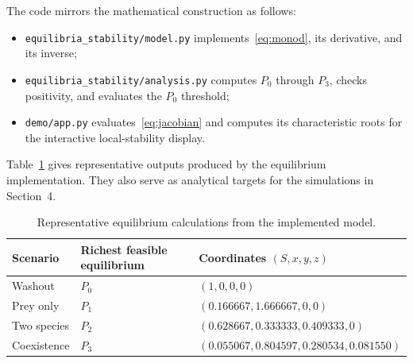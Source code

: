 The code mirrors the mathematical construction as follows:
\begin{itemize}
\item \texttt{equilibria\_stability/model.py} implements~\eqref{eq:monod},
      its derivative, and its inverse;
\item \texttt{equilibria\_stability/analysis.py} computes \(P_0\) through
      \(P_3\), checks positivity, and evaluates the \(P_0\) threshold;
\item \texttt{demo/app.py} evaluates~\eqref{eq:jacobian} and computes its
      characteristic roots for the interactive local-stability display.
\end{itemize}

Table~\ref{tab:equilibrium-code-check} gives representative outputs produced
by the equilibrium implementation.  They also serve as analytical targets for
the simulations in Section~4.

\begin{table}[htbp]
\centering
\caption{Representative equilibrium calculations from the implemented model.}
\label{tab:equilibrium-code-check}
\small
\begin{tabular}{lll}
\toprule
Scenario & Richest feasible equilibrium & Coordinates \((S,x,y,z)\) \\
\midrule
Washout & \(P_0\) & \((1,0,0,0)\) \\
Prey only & \(P_1\) & \((0.166667,1.666667,0,0)\) \\
Two species & \(P_2\) & \((0.628667,0.333333,0.409333,0)\) \\
Coexistence & \(P_3\) & \((0.055067,0.804597,0.280534,0.081550)\) \\
\bottomrule
\end{tabular}
\end{table}
